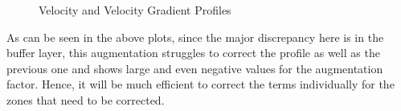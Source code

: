 \documentclass{article}
\begin{document}
\begin{figure}[H]
\caption{Velocity and Velocity Gradient Profiles}                                                                                       %
\label{vel2}                                                                                                     %
\end{figure}                                                                                                      %
As can be seen in the above plots, since the major discrepancy here is in the buffer layer, this augmentation struggles
to correct the profile as well as the previous one and shows large and even negative values for the augmentation factor.
Hence, it will be much efficient to correct the terms individually for the zones that need to be corrected.
\end{document}
